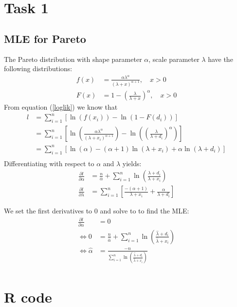 \documentclass[titlepage]{article}
\begin{document}
	
	
	\appendix
	\section{Task 1}
	\subsection{MLE for Pareto}
	The Pareto distribution with shape parameter $ \alpha $, scale parameter $ \lambda $ have the following distributions:
	\begin{align*}
	f(x) &= \frac{\alpha \lambda^\alpha}{(\lambda+x)^{\alpha + 1}}, \quad x > 0\\
	F(x) &= 1-\left(\frac{\lambda}{\lambda + x}\right)^\alpha, \quad x > 0
	\end{align*}
	From equation (\ref{loglik}) we know that 
	\begin{align*}
		l&=\sum_{i=1}^{n}\left[\ln(f(x_i)) - \ln(1-F(d_i))\right]\\
		&=\sum_{i=1}^{n}\left[\ln\left(\frac{\alpha\lambda^\alpha}{(\lambda + x_i)^{\alpha+1}}\right) - \ln\left(\left(\frac{\lambda}{\lambda + d_i}\right)^\alpha\right)\right]\\
		&=\sum_{i=1}^{n}\left[\ln(\alpha) - (\alpha + 1)\ln(\lambda + x_i) + \alpha\ln(\lambda+d_i)\right]\\
	\end{align*}
	Differentiating with respect to $\alpha$ and $\lambda$ yields:
	\begin{align}
		\frac{\partial l}{\partial\alpha}&=\frac{n}{\alpha} +\sum_{i=1}^{n}\ln\left(\frac{\lambda + d_i}{\lambda+x_i}\right)\\
		\frac{\partial l}{\partial\lambda}&=\sum_{i=1}^{n}\left[\frac{-(\alpha+1)}{\lambda+x_i}+\frac{\alpha}{\lambda+d_i}\right]
	\end{align}

	We set the first derivatives to $0$ and solve to to find the MLE:
	\begin{align}
		\frac{\partial l}{\partial\alpha}&=0 \nonumber\\
		\Leftrightarrow 0 &= \frac{n}{\hat{\alpha}} +\sum_{i=1}^{n}\ln\left(\frac{\hat{\lambda} + d_i}{\hat{\lambda}+x_i}\right) \nonumber\\
		\Leftrightarrow \hat{\alpha} &= \frac{-n}{\sum_{i=1}^{n}\ln\left(\frac{\hat{\lambda} + d_i}{\hat{\lambda}+x_i}\right)}\\
	\end{align}

	\section{R code}
\end{document}
